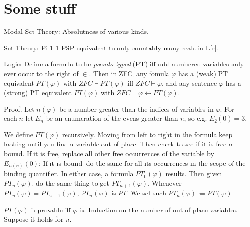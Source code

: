 \documentclass{article}
\begin{document}
\section{Some stuff}
Modal Set Theory:
Absolutness of various kinds.

Set Theory: 
Pi 1-1 PSP equivalent to only countably many reals in L[r].

Logic: 
Define a formula to be \emph{pseudo typed} (PT) iff 
odd numbered variables only ever occur
to the right of $\in$. 
Then in ZFC, any fomula $\varphi$ has a (weak) PT equivalent
$PT(\varphi)$ with $ZFC \vdash PT(\varphi)$ iff $ZFC \vdash \varphi$, 
and any sentence 
$\varphi$ has a (strong) PT equivalent $PT(\varphi)$ with 
$ZFC \vdash \varphi \leftrightarrow PT(\varphi)$.

Proof. Let $n(\varphi)$ be a number greater than the indices of variables in 
$\varphi$. For each $n$ let $E_n$ be an enumeration of 
the evens greater than $n$, so e.g. $E_2(0)=3$. 

We define $PT(\varphi)$ recursively. Moving from left to right in the formula 
keep looking until you find a variable out of place. Then check to see 
if it is free or bound. If it is free, replace all other free occurrences of the 
variable by $E_{n(\varphi)}(0)$; If 
it is bound, do the same for all its occurrences in the scope 
of the binding quantifier. In either case, a formula $PT_0(\varphi)$
results. Then given $PT_n(\varphi)$, do the same thing to get $PT_{n+1}(\varphi)$.
Whenever $PT_n(\varphi) = PT_{n+1}(\varphi)$, $PT_n(\varphi)$ is $PT$. We set 
such $PT_n(\varphi) := PT(\varphi)$.

$PT(\varphi)$ is provable iff $\varphi$ is. Induction on the number of out-of-place 
variables. Suppose it holds for $n$.
\end{document}
